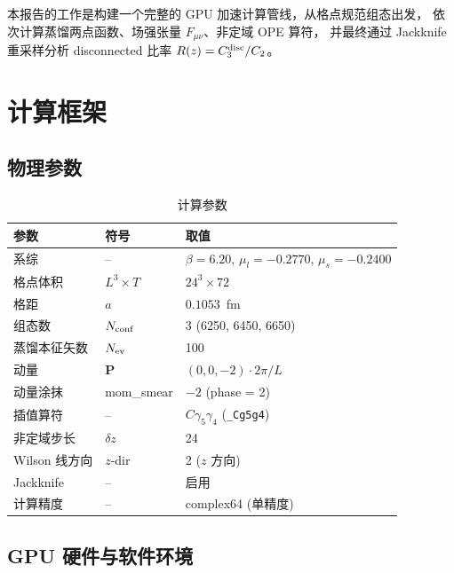 \documentclass[11pt,a4paper]{article}
\begin{document}
本报告的工作是构建一个完整的 GPU 加速计算管线，从格点规范组态出发，
依次计算蒸馏两点函数、场强张量 $F_{\mu\nu}$、非定域 OPE 算符，
并最终通过 Jackknife 重采样分析 disconnected 比率 $R(z) = C_3^{\rm disc}/C_2$。

\section{计算框架}

\subsection{物理参数}

\begin{table}[H]
  \centering
  \caption{计算参数}
  \label{tab:parameters}
  \begin{tabular}{lll}
    \toprule
    参数 & 符号 & 取值 \\
    \midrule
    系综 & -- & $\beta=6.20$, $\mu_l=-0.2770$, $\mu_s=-0.2400$ \\
    格点体积 & $L^3 \times T$ & $24^3 \times 72$ \\
    格距 & $a$ & $0.1053$~fm \\
    组态数 & $N_{\rm conf}$ & 3 (6250, 6450, 6650) \\
    蒸馏本征矢数 & $N_{\rm ev}$ & 100 \\
    动量 & $\mathbf{P}$ & $(0, 0, -2) \cdot 2\pi/L$ \\
    动量涂抹 & mom\_smear & $-2$ (phase = 2) \\
    插值算符 & -- & $C\gamma_5\gamma_4$ (\texttt{\_Cg5g4}) \\
    非定域步长 & $\delta z$ & 24 \\
    Wilson 线方向 & $z$-dir & 2 ($z$ 方向) \\
    Jackknife & -- & 启用 \\
    计算精度 & -- & complex64 (单精度) \\
    \bottomrule
  \end{tabular}
\end{table}

\subsection{GPU 硬件与软件环境}
\end{document}
